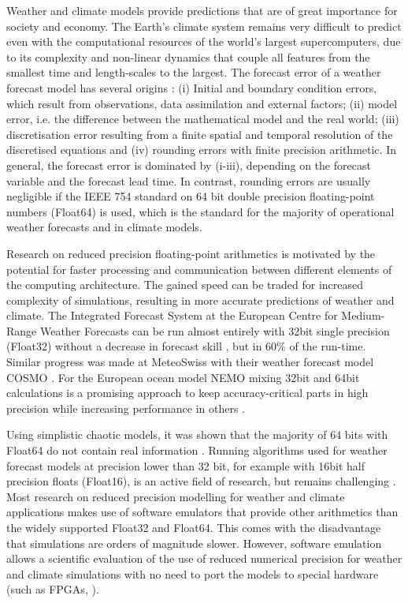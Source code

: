 \documentclass[draft]{agujournal2019}
\begin{document}
Weather and climate models provide predictions that are of great importance for society and economy. The Earth's climate system remains very difficult to predict even with the computational resources of the world's largest supercomputers, due to its complexity and non-linear dynamics that couple all features from the smallest time and length-scales to the largest. The forecast error of a weather forecast model has several origins \cite{Palmer2012,Palmer2015}: (i) Initial and boundary condition errors, which result from observations, data assimilation and external factors; (ii) model error, i.e. the difference between the mathematical model and the real world; (iii) discretisation error resulting from a finite spatial and temporal resolution of the discretised equations and (iv) rounding errors with finite precision arithmetic. In general, the forecast error is dominated by (i-iii), depending on the forecast variable and the forecast lead time. In contrast, rounding errors are usually negligible if the IEEE 754 standard on 64 bit double precision floating-point numbers (Float64) is used, which is the standard for the majority of operational weather forecasts and in climate models.

Research on reduced precision floating-point arithmetics is motivated by the potential for faster processing and communication between different elements of the computing architecture. The gained speed can be traded for increased complexity of simulations, resulting in more accurate predictions of weather and climate. The Integrated Forecast System at the European Centre for Medium-Range Weather Forecasts can be run almost entirely with 32bit single precision (Float32) without a decrease in forecast skill \cite{Vana2017}, but in 60\% of the run-time. Similar progress was made at MeteoSwiss with their weather forecast model COSMO \cite{Rudisuhli2013}. For the European ocean model NEMO mixing 32bit and 64bit calculations is a promising approach to keep accuracy-critical parts in high precision while increasing performance in others \cite{TintoPrims2019}.

Using simplistic chaotic models, it was shown that the majority of 64 bits with Float64 do not contain real information \cite{Jeffress2017}. Running algorithms used for weather forecast models at precision lower than 32 bit, for example with 16bit half precision floats (Float16), is an active field of research, but remains challenging \cite{Duben2014,Thornes2017,Hatfield2018,Duben2018}. Most research on reduced precision modelling for weather and climate applications makes use of software emulators \cite{Dawson2017} that provide other arithmetics than the widely supported Float32 and Float64. This comes with the disadvantage that simulations are orders of magnitude slower. However, software emulation allows a scientific evaluation of the use of reduced numerical precision for weather and climate simulations with no need to port the models to special hardware (such as FPGAs, \cite{Russell2017}).
\end{document}
